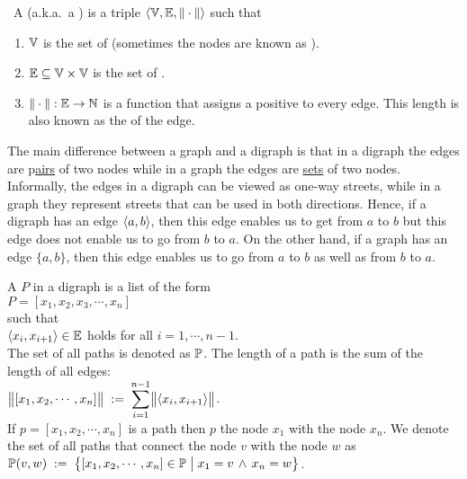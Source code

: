 \begin{Definition} \
  A  (a.k.a.~a ) is a triple 
  $\langle {\mathbb V}, {\mathbb E}, \|\cdot\| \rangle$ such that
  \begin{enumerate}
  \item ${\mathbb V}$ is the set of  (sometimes the nodes are known as ).
  \item ${\mathbb E} \subseteq {\mathbb V} \times {\mathbb V}$ is the set of \blue{edges}.
  \item $\|\cdot\|: {\mathbb E} \rightarrow {\mathbb N}$ is a function that assigns a positive  
        to every edge.  This length is also known as the \blue{weight} of the edge.
        \eox
  \end{enumerate}
\end{Definition}

\remark
The main difference between a graph and a digraph is that in a digraph the edges are 
\mbox{p\hspace{-0.15cm}\underline{\hspace{0.15cm}airs}} of two
nodes while in a graph the edges are \underline{sets} of two nodes.  Informally, the edges in a
digraph can be viewed as one-way streets, while in a graph they represent streets that can be used in both
directions.  Hence, if a digraph has an edge $\pair(a,b)$, then this edge enables us to get from $a$ to $b$ but
this edge does not enable us to go from $b$ to $a$.  On the other hand, if a graph has an edge $\{a,b\}$, then
this edge enables us to go from $a$ to $b$ as well as from $b$ to $a$.
\eox

\begin{Definition}
 A  $P$ in a digraph is a list of the form 
\\[0.2cm]
\hspace*{1.3cm} 
$P = [ x_1, x_2, x_3, \cdots, x_n ]$ 
\\[0.2cm]
such that
\\[0.2cm]
\hspace*{1.3cm} $\pair(x_i,x_{i+1}) \in \edges$ \quad holds for all $i = 1, \cdots, n-1$. 
\\[0.2cm]
The set of all paths is denoted as ${\mathbb P}$.
The length of a path is the sum of the length of all edges:
\\[0.2cm]
\hspace*{1.3cm}
$\ds\Weight{[x_1,x_2, \cdots, x_n]} \df \sum\limits_{i=1}^{n-1} \Weight{\pair(x_i,x_{i+1})}$. 
\\[0.2cm]
If  $p = [x_1, x_2, \cdots, x_n]$ is a path then  $p$  the node $x_1$ with the node
$x_n$.  We denote the set of all paths that connect the node $v$ with the node $w$ as
\\[0.2cm]
\hspace*{1.3cm} 
 ${\mathbb P}(v,w) \;:=\; \bigl\{ [x_1, x_2, \cdots, x_n] \in {\mathbb P} \bigm| x_1 = v \,\wedge\, x_n = w \bigr\}$.
\end{Definition}


